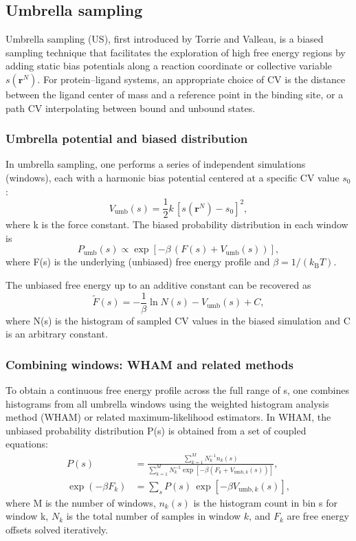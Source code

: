 \documentclass[12pt]{article}
\begin{document}
\subsection{Umbrella sampling}

Umbrella sampling (US), first introduced by Torrie and Valleau\cite{CH9_TorrieValleau1977}, is a biased sampling technique that facilitates the exploration of high free energy regions by adding static bias potentials along a reaction coordinate or collective variable $s(\mathbf{r}^N)$. For protein--ligand systems, an appropriate choice of CV is the distance between the ligand center of mass and a reference point in the binding site, or a path CV interpolating between bound and unbound states.

\subsubsection{Umbrella potential and biased distribution}

In umbrella sampling, one performs a series of independent simulations (windows), each with a harmonic bias potential centered at a specific CV value $s_0$:
\[
V_{\text{umb}}(s) = \frac{1}{2}k\,[s(\mathbf{r}^N) - s_0]^2,
\]
where k is the force constant.\cite{CH9_Kastner2011} The biased probability distribution in each window is
\[
P_{\text{umb}}(s) \propto \exp\left[-\beta\,(F(s) + V_{\text{umb}}(s))\right],
\]
where F(s) is the underlying (unbiased) free energy profile and $\beta = 1/(k_{\mathrm{B}}T)$.

The unbiased free energy up to an additive constant can be recovered as
\[
\tilde{F}(s) = -\frac{1}{\beta}\ln N(s) - V_{\text{umb}}(s) + C,
\]
where N(s) is the histogram of sampled CV values in the biased simulation and C is an arbitrary constant.\cite{CH9_Kastner2011}

\subsubsection{Combining windows: WHAM and related methods}

To obtain a continuous free energy profile across the full range of s, one combines histograms from all umbrella windows using the weighted histogram analysis method (WHAM) or related maximum-likelihood estimators.\cite{CH9_Kumar1992,CH9_Roux1995} In WHAM, the unbiased probability distribution P(s) is obtained from a set of coupled equations:
\begin{align}
P(s) &= \frac{\sum_{k=1}^{M} N_k^{-1} n_k(s)}{\sum_{k=1}^{M} N_k^{-1} \exp\left[-\beta \left(F_k + V_{\text{umb},k}(s)\right)\right]}, \\
\exp(-\beta F_k) &= \sum_{s} P(s)\,\exp\left[-\beta V_{\text{umb},k}(s)\right],
\end{align}
where M is the number of windows, $n_k(s)$ is the histogram count in bin s for window k, $N_k$ is the total number of samples in window $k$, and $F_k$ are free energy offsets solved iteratively.
\end{document}
